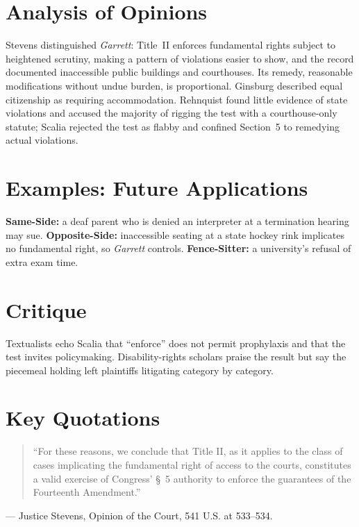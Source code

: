 \documentclass[12pt]{article}
\begin{document}
\section{Analysis of Opinions}
Stevens distinguished \textit{Garrett}: Title~II enforces fundamental rights subject to heightened scrutiny, making a pattern of violations easier to show, and the record documented inaccessible public buildings and courthouses. Its remedy, reasonable modifications without undue burden, is proportional. Ginsburg described equal citizenship as requiring accommodation. Rehnquist found little evidence of state violations and accused the majority of rigging the test with a courthouse-only statute; Scalia rejected the test as flabby and confined Section~5 to remedying actual violations.

\section{Examples: Future Applications}
\textbf{Same-Side:} a deaf parent who is denied an interpreter at a termination hearing may sue. \textbf{Opposite-Side:} inaccessible seating at a state hockey rink implicates no fundamental right, so \textit{Garrett} controls. \textbf{Fence-Sitter:} a university's refusal of extra exam time.

\section{Critique}
Textualists echo Scalia that ``enforce'' does not permit prophylaxis and that the test invites policymaking. Disability-rights scholars praise the result but say the piecemeal holding left plaintiffs litigating category by category.

\section{Key Quotations}
\begin{quote}
``For these reasons, we conclude that Title II, as it applies to the class of cases implicating the fundamental right of access to the courts, constitutes a valid exercise of Congress' \S~5 authority to enforce the guarantees of the Fourteenth Amendment.''
\end{quote}
\noindent --- Justice Stevens, Opinion of the Court, 541 U.S. at 533--534.
\end{document}
